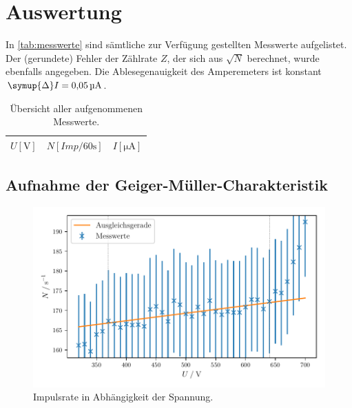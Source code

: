 \section{Auswertung} \label{sec:Auswertung}

In \autoref{tab:messwerte} sind sämtliche zur Verfügung gestellten Messwerte aufgelistet.
Der (gerundete) Fehler der Zählrate $Z$, der sich aus $\sqrt{N}$ berechnet, wurde ebenfalls angegeben.
Die Ablesegenauigkeit des Amperemeters ist konstant $\symup{\Delta}I=\SI{0.05}{\micro\ampere}$.

\begin{table}[H]
  \centering
  \caption{Übersicht aller aufgenommenen Messwerte.}
  \label{tab:messwerte}
  \begin{tabular}{c c c}
  \toprule
  $U [\si{\volt}]$ &
  $N [\si{{Imp} \per 60 \second}]$ &
  $I [\si{\micro\ampere}]$ \\
  \midrule
  
  \bottomrule
  \end{tabular}
\end{table}


\subsection{Aufnahme der Geiger-Müller-Charakteristik}


\begin{figure}
  \centering
  \includegraphics[width=\textwidth]{build/plot1.pdf}
  \caption{Impulsrate in Abhängigkeit der Spannung.}
  \label{fig:plot1}
\end{figure}

